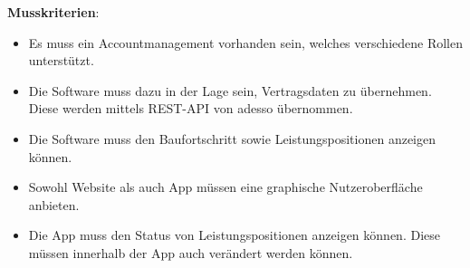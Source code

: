 
\textbf{Musskriterien}:
\begin{itemize}
	\item Es muss ein Accountmanagement vorhanden sein, welches verschiedene Rollen unterstützt.
	\item Die Software muss dazu in der Lage sein, Vertragsdaten zu übernehmen. Diese werden mittels REST-API von adesso übernommen.
	\item Die Software muss den Baufortschritt sowie Leistungspositionen anzeigen können.
	\item Sowohl Website als auch App müssen eine graphische Nutzeroberfläche anbieten.
	\item Die App muss den Status von Leistungspositionen anzeigen können.
	Diese müssen innerhalb der App auch verändert werden können.
\end{itemize}

